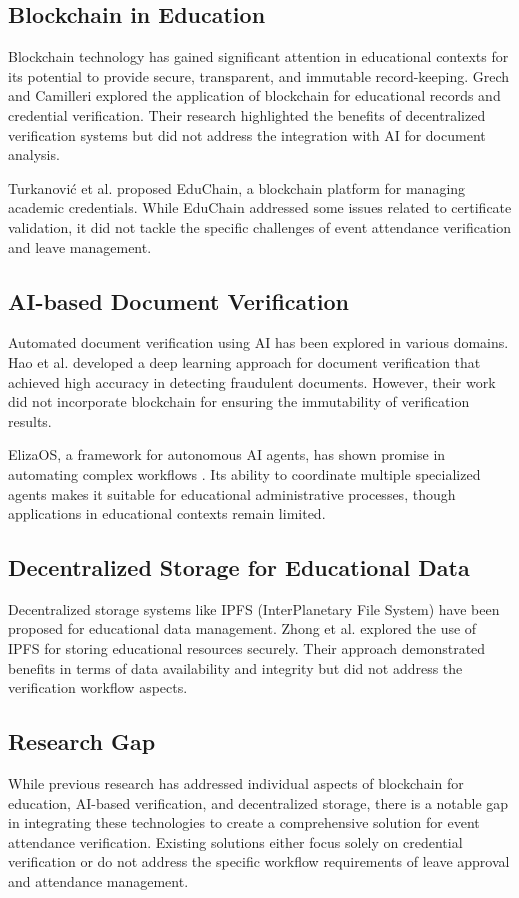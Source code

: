 \documentclass[a4paper,12pt]{article}
\begin{document}
\subsection{Blockchain in Education}
Blockchain technology has gained significant attention in educational contexts for its potential to provide secure, transparent, and immutable record-keeping. Grech and Camilleri \cite{grech2017blockchain} explored the application of blockchain for educational records and credential verification. Their research highlighted the benefits of decentralized verification systems but did not address the integration with AI for document analysis.

Turkanović et al. \cite{turkanovc2018educhain} proposed EduChain, a blockchain platform for managing academic credentials. While EduChain addressed some issues related to certificate validation, it did not tackle the specific challenges of event attendance verification and leave management.

\subsection{AI-based Document Verification}
Automated document verification using AI has been explored in various domains. Hao et al. \cite{hao2020document} developed a deep learning approach for document verification that achieved high accuracy in detecting fraudulent documents. However, their work did not incorporate blockchain for ensuring the immutability of verification results.

ElizaOS, a framework for autonomous AI agents, has shown promise in automating complex workflows \cite{elizaos2023}. Its ability to coordinate multiple specialized agents makes it suitable for educational administrative processes, though applications in educational contexts remain limited.

\subsection{Decentralized Storage for Educational Data}
Decentralized storage systems like IPFS (InterPlanetary File System) have been proposed for educational data management. Zhong et al. \cite{zhong2018data} explored the use of IPFS for storing educational resources securely. Their approach demonstrated benefits in terms of data availability and integrity but did not address the verification workflow aspects.

\subsection{Research Gap}
While previous research has addressed individual aspects of blockchain for education, AI-based verification, and decentralized storage, there is a notable gap in integrating these technologies to create a comprehensive solution for event attendance verification. Existing solutions either focus solely on credential verification or do not address the specific workflow requirements of leave approval and attendance management.
\end{document}
